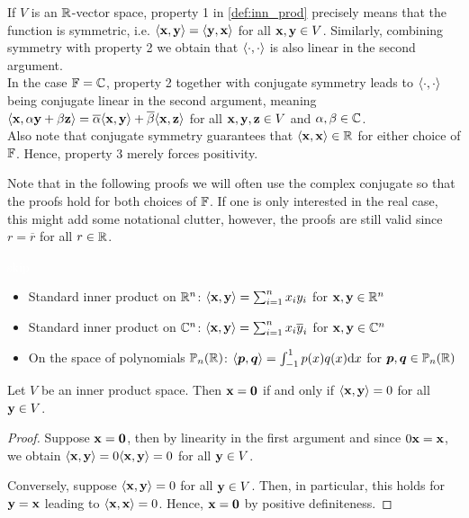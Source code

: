 \documentclass{article}
\begin{document}
If $V$ is an ${\mathbb{R}}$-vector space, property 1 in \cref{def:inn_prod} precisely means that the function is symmetric, i.e. $\langle {\mathbf{x}},{\mathbf{y}} \rangle = \langle {\mathbf{y}},{\mathbf{x}} \rangle$ for all ${\mathbf{x}},{\mathbf{y}}\in V$. Similarly, combining symmetry with property 2 we obtain that $\langle \cdot,\cdot \rangle$ is also linear in the second argument. \\
In the case ${\mathbb{F}} = {\mathbb{C}}$, property 2 together with conjugate symmetry leads to $\langle \cdot,\cdot \rangle$ being conjugate linear in the second argument, meaning $\langle {\mathbf{x}},\alpha {\mathbf{y}} +\beta {\mathbf{z}} \rangle = \overline{\alpha} \langle {\mathbf{x}},{\mathbf{y}} \rangle + \overline{\beta} \langle {\mathbf{x}},{\mathbf{z}} \rangle$ for all ${\mathbf{x}},{\mathbf{y}},{\mathbf{z}}\in V$ and $\alpha, \beta \in {\mathbb{C}}$.\\
Also note that conjugate symmetry guarantees that $\langle {\mathbf{x}},{\mathbf{x}} \rangle \in {\mathbb{R}}$ for either choice of ${\mathbb{F}}$. Hence, property 3 merely forces positivity. 


Note that in the following proofs we will often use the complex conjugate so that the proofs hold for both choices of ${\mathbb{F}}$. If one is only interested in the real case, this might add some notational clutter, however, the proofs are still valid since $r = \overline{r}$ for all $r\in {\mathbb{R}}$.

\begin{example}
\textcolor{white}{skip}
\begin{itemize}
    \item Standard inner product on ${\mathbb{R}}^n$: $\langle {\mathbf{x}},{\mathbf{y}}  \rangle= \sum_{i=1}^n x_iy_i$ for ${\mathbf{x}},{\mathbf{y}}\in {\mathbb{R}}^n$
    \item Standard inner product on ${\mathbb{C}}^n$: $\langle {\mathbf{x}},{\mathbf{y}}  \rangle= \sum_{i=1}^n x_i\overline{y}_i$ for ${\mathbf{x}},{\mathbf{y}}\in {\mathbb{C}}^n$
    \item On the space of polynomials $\mathbb{P}_n({\mathbb{R}})$: $\langle \boldsymbol{p},\boldsymbol{q} \rangle = \int_{-1}^1 p(x) {q}(x) \mathrm{d}x$ for $\boldsymbol{p},\boldsymbol{q}\in \mathbb{P}_n({\mathbb{R}})$
\end{itemize}
\end{example}

\begin{proposition}\label{prop:zerovec_by_innerprod}
Let $V$ be an inner product space. Then ${\mathbf{x}} = {\mathbf{0}}$ if and only if $\langle {\mathbf{x}},{\mathbf{y}}  \rangle = 0$ for all ${\mathbf{y}} \in V$.
\end{proposition}

\begin{proof}
Suppose ${\mathbf{x}} = {\mathbf{0}}$, then by linearity in the first argument and since $0 {\mathbf{x}} = {\mathbf{x}}$, we obtain $\langle {\mathbf{x}},{\mathbf{y}}  \rangle = 0 \langle {\mathbf{x}},{\mathbf{y}}  \rangle = 0$ for all ${\mathbf{y}} \in V$.

Conversely, suppose $\langle {\mathbf{x}},{\mathbf{y}}  \rangle = 0$ for all ${\mathbf{y}} \in V$. Then, in particular, this holds for ${\mathbf{y}} = {\mathbf{x}}$ leading to $\langle {\mathbf{x}},{\mathbf{x}} \rangle = 0$. Hence, ${\mathbf{x}} = {\mathbf{0}}$ by positive definiteness. 
\end{proof}
\end{document}
